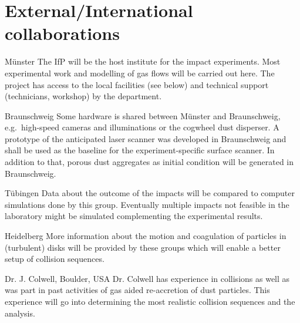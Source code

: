 \section{External/International collaborations}
\begin{collablist}
\item[M\"unster] The IfP will be the host institute for the impact experiments.
Most experimental work and modelling of gas flows will be carried out
here. The project has access to the local facilities (see below) and technical 
support (technicians, workshop) by the department.
\item[Braunschweig] Some hardware is shared between M\"unster and
Braunschweig, e.g.\ high-speed cameras and illuminations or the
cogwheel dust disperser. A prototype of the anticipated laser
scanner was developed in Braunschweig and shall be used as the
baseline for the experiment-specific surface scanner. In addition
to that, porous dust aggregates as initial condition will be
generated in Braunschweig. 
\item[T\"ubingen] Data about the outcome
of the impacts will be compared to computer simulations done by
this group. Eventually multiple impacts not feasible in the
laboratory might be simulated complementing the experimental
results. 
\item[Heidelberg] More information about the motion and
coagulation of particles in (turbulent) disks will be provided by
these groups which will enable a better setup of collision
sequences. 
\item[Dr. J. Colwell, Boulder, USA] Dr. Colwell has
experience in collisions as well as was part in past activities of
gas aided re-accretion of dust particles. This experience will go
into determining the most realistic collision sequences and the
analysis.
\end{collablist}



